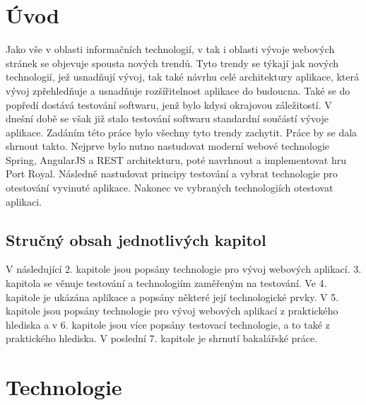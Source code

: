 \documentclass[czech,master,public,dept460,male,cpdeclaration,twoside]{diploma}
\begin{document}
\MakeTitlePages

\lstlistoflistings

\section{Úvod}
Jako vše v oblasti informačních technologií, v tak i oblasti vývoje webových stránek se objevuje spousta nových trendů. Tyto trendy se týkají jak nových technologií, jež usnadňují vývoj, tak také návrhu celé architektury aplikace, která vývoj zpřehledňuje a usnadňuje rozšířitelnost aplikace do budoucna. Také se do popředí dostává testování softwaru, jenž bylo kdysi okrajovou záležitostí. V dnešní době se však již stalo testování softwaru standardní součástí vývoje aplikace. Zadáním této práce bylo všechny tyto trendy zachytit. Práce by se dala shrnout takto. Nejprve bylo nutno nastudovat moderní webové technologie Spring, AngularJS a REST architekturu, poté navrhnout a implementovat hru Port Royal. Následně nastudovat principy testování a vybrat technologie pro otestování vyvinuté aplikace. Nakonec ve vybraných technologiích otestovat aplikaci.


\subsection{Stručný obsah jednotlivých kapitol}
V následující 2. kapitole jsou popsány technologie pro vývoj webových aplikací. 3. kapitola se věnuje testování a technologiím zaměřeným na testování. Ve 4. kapitole je ukázána aplikace a popsány některé její technologické prvky. V 5. kapitole jsou popsány technologie pro vývoj webových aplikací z praktického hlediska a v 6. kapitole jsou více popsány testovací technologie, a to také z praktického hlediska. V poslední 7. kapitole je shrnutí bakalářské práce.

\section{Technologie}
\end{document}

